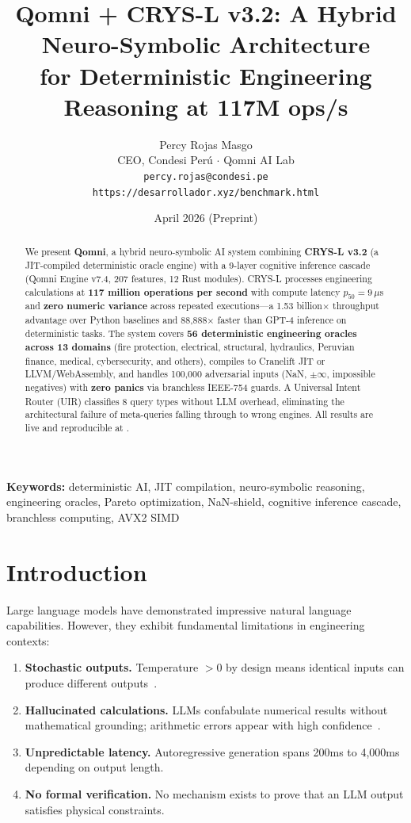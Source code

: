 \documentclass[11pt]{article}
\title{\textbf{Qomni + CRYS-L v3.2: A Hybrid Neuro-Symbolic Architecture\\
for Deterministic Engineering Reasoning at 117M ops/s}}
\author{
    Percy Rojas Masgo \\
    CEO, Condesi Per\'u $\cdot$ Qomni AI Lab \\
    \texttt{percy.rojas@condesi.pe} \\
    \texttt{https://desarrollador.xyz/benchmark.html}
}
\date{April 2026 \quad (Preprint)}
\begin{document}
\maketitle

\begin{abstract}
We present \textbf{Qomni}, a hybrid neuro-symbolic AI system combining
\textbf{CRYS-L v3.2} (a JIT-compiled deterministic oracle engine) with a
9-layer cognitive inference cascade (Qomni Engine v7.4, 207 features, 12 Rust modules).
CRYS-L processes engineering calculations at \textbf{117 million operations per second}
with compute latency $p_{50} = 9\,\mu$s and \textbf{zero numeric variance} across
repeated executions---a 1.53 billion$\times$ throughput advantage over Python baselines
and 88,888$\times$ faster than GPT-4 inference on deterministic tasks.
The system covers \textbf{56 deterministic engineering oracles across 13 domains}
(fire protection, electrical, structural, hydraulics, Peruvian finance, medical,
cybersecurity, and others), compiles to Cranelift JIT or LLVM/WebAssembly, and
handles 100,000 adversarial inputs (NaN, $\pm\infty$, impossible negatives) with
\textbf{zero panics} via branchless IEEE-754 guards.
A Universal Intent Router (UIR) classifies 8 query types without LLM overhead,
eliminating the architectural failure of meta-queries falling through to wrong engines.
All results are live and reproducible at
.
\end{abstract}

\textbf{Keywords:} deterministic AI, JIT compilation, neuro-symbolic reasoning,
engineering oracles, Pareto optimization, NaN-shield, cognitive inference cascade,
branchless computing, AVX2 SIMD

\section{Introduction}

Large language models have demonstrated impressive natural language capabilities.
However, they exhibit fundamental limitations in engineering contexts:

\begin{enumerate}
\item \textbf{Stochastic outputs.} Temperature $>0$ by design means identical
      inputs can produce different outputs~\cite{openai2023gpt4}.
\item \textbf{Hallucinated calculations.} LLMs confabulate numerical results
      without mathematical grounding; arithmetic errors appear with high
      confidence~\cite{bubeck2023sparks}.
\item \textbf{Unpredictable latency.} Autoregressive generation spans 200ms
      to 4,000ms depending on output length.
\item \textbf{No formal verification.} No mechanism exists to prove that an LLM
      output satisfies physical constraints.
\end{enumerate}
\end{document}
